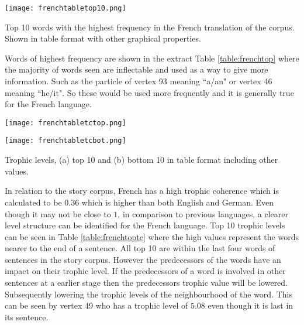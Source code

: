 \begin{table}[H]
\centering
\texttt{[image: frenchtabletop10.png]}
\caption{Top 10 words with the highest frequency in the French translation of the corpus. Shown in table format with other graphical properties. }
\label{table:frenchtop}
\end{table}

Words of highest frequency are shown in the extract Table \ref{table:frenchtop} where the majority of words seen are inflectable and used as a way to give more information. Such as the particle of vertex 93 meaning ``a/an" or vertex 46 meaning ``he/it". So these would be used more frequently and it is generally true for the French language.

\begin{table}[H]
\centering
\begin{subtable}{.45\textwidth}
	\centering
	\texttt{[image: frenchtabletctop.png]}
	\caption{}
	\label{table:frenchtoptc}
\end{subtable}
\hfill
\begin{subtable}{.45\textwidth}
	\centering
	\texttt{[image: frenchtabletcbot.png]}
	\caption{}
	\label{table:frenchbottc}
\end{subtable}
\caption{Trophic levels, (a) top 10 and (b) bottom 10 in table format including other values.}
\end{table}

In relation to the story corpus, French has a high trophic coherence which is calculated to be $0.36$ which is higher than both English and German. Even though it may not be close to $1$, in comparison to previous languages, a clearer level structure can be identified for the French language. Top 10 trophic levels can be seen in Table \ref{table:frenchtoptc} where the high values represent the words nearer to the end of a sentence. All top 10 are within the last four words of sentences in the story corpus. However the predecessors of the words have an impact on their trophic level. If the predecessors of a word is involved in other sentences at a earlier stage then the predecessors trophic value will be lowered. Subsequently lowering the trophic levels of the neighbourhood of the word. This can be seen by vertex 49 who has a trophic level of $5.08$ even though it is last in its sentence.

